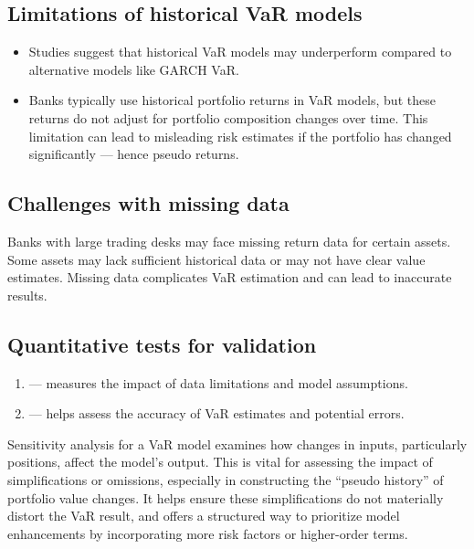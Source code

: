 \subsection{Limitations of historical VaR models}
\begin{itemize}
\item Studies suggest that historical VaR models may underperform compared to alternative models
      like GARCH VaR.
\item Banks typically use historical portfolio returns in VaR models, but these returns do not
      adjust for portfolio composition changes over time. This limitation can lead to misleading
      risk estimates if the portfolio has changed significantly --- hence pseudo returns.
\end{itemize}

\subsection{Challenges with missing data}
Banks with large trading desks may face missing return data for certain assets. Some assets may
lack sufficient historical data or may not have clear value estimates. Missing data complicates
VaR estimation and can lead to inaccurate results.

\subsection{Quantitative tests for validation}
\begin{enumerate}
\item {} --- measures the impact of data limitations and model
      assumptions.
\item {} --- helps assess the accuracy of VaR estimates and potential
      errors.
\end{enumerate}


Sensitivity analysis for a VaR model examines how changes in inputs, particularly positions,
affect the model's output. This is vital for assessing the impact of simplifications or
omissions, especially in constructing the ``pseudo history'' of portfolio value changes. It
helps ensure these simplifications do not materially distort the VaR result, and offers a
structured way to prioritize model enhancements by incorporating more risk factors or
higher-order terms.

